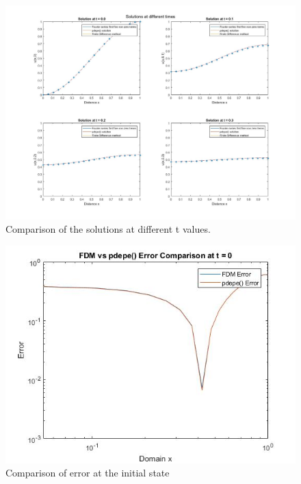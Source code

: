 \documentclass{article}
\begin{document}
\begin{figure}
	\begin{center}
		\includegraphics[width=\textwidth,height=\textheight,keepaspectratio]{MATLAB/A2.jpg}
	\end{center}
	\caption{Comparison of the solutions at different t values.}
\end{figure}
\begin{figure}
	\begin{center}
		\includegraphics[width=\textwidth,height=\textheight,keepaspectratio]{MATLAB/A3.jpg}
	\end{center}
	\caption{Comparison of error at the initial state}
\end{figure}
\newpage
\end{document}
